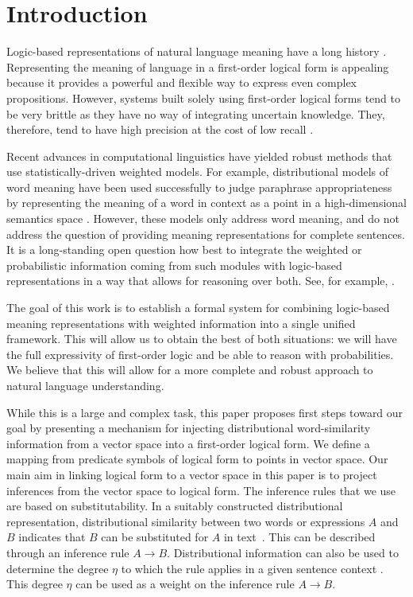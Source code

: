 \section{Introduction}

Logic-based representations of natural language meaning have a long history
\citep{montague:tj1970,kamp:book93}\nocite{thomason:book1974}.
Representing the meaning of language in a first-order logical form is appealing
because it provides a powerful and flexible way to express even complex
propositions. However, systems built solely using first-order logical forms tend
to be very brittle as they have no way of integrating uncertain knowledge.
They, therefore, tend to have high precision at the cost of low recall
\citep{bos:emnlp2005}.

Recent advances in computational linguistics have yielded robust methods that
use statistically-driven weighted models.  For example, distributional
models of word meaning have been used successfully to judge paraphrase
appropriateness by representing the meaning of a word in context as a point in a
high-dimensional semantics space
\citep{erk:emnlp2008,thater:acl2010,reisinger:naacl2010,dinu:emnlp2010,vandecruys:emnlp2011}.
However, these models only address word meaning, and do not
address the question of providing meaning representations for complete
sentences. It is a long-standing open question how best to
integrate the weighted or probabilistic information coming from such modules
with logic-based representations in a way that allows for reasoning over both. 
See, for example, \citet{hobbs:alj93}.

The goal of this work is to establish a formal system for combining
logic-based meaning representations with weighted information into a single
unified framework.  This will allow us to obtain the best of both situations: we
will have the full expressivity of first-order logic and be able to reason with
probabilities.  We believe that this will allow for a more complete and robust
approach to natural language understanding.

While this is a large and complex task, this paper proposes first steps toward
our goal by presenting a mechanism for injecting distributional word-similarity
information from a vector space into a first-order logical form.  We
define a mapping from predicate symbols of logical form to points in
vector space. Our main aim in linking logical form to a vector
 space in this paper is to project inferences from the vector space to
logical form. The inference rules that we use are based on
substitutability. In a suitably constructed distributional
representation, distributional similarity between two words or
expressions $A$ and $B$ indicates
that $B$ can be substituted for $A$ in text~\citep{lin:nlej2001}. This can be described through an inference rule $A \to B$. Distributional
information can also be used to determine the degree $\eta$ to which the rule applies in a
given sentence context
\citep{SzpektorEtAl:08,mitchell:acl2008,erk:emnlp2008,thater:acl2010,reisinger:naacl2010,dinu:emnlp2010,vandecruys:emnlp2011}. This
degree $\eta$ can be used as a weight on the inference rule $A\to B$. 

